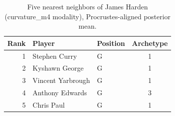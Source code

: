 \begin{table}[htbp]
  \centering\small
  \begin{tabular}{rllc}
    \toprule
    Rank & Player & Position & Archetype \\
    \midrule
    1 & Stephen Curry & G & 1 \\
    2 & Kyshawn George & G & 1 \\
    3 & Vincent Yarbrough & G & 1 \\
    4 & Anthony Edwards & G & 3 \\
    5 & Chris Paul & G & 1 \\
    \bottomrule
  \end{tabular}
  \caption{Five nearest neighbors of James Harden (curvature_m4 modality), Procrustes-aligned posterior mean.}
  \label{tab:James_Harden_neighbors_curvature_m4}
\end{table}

